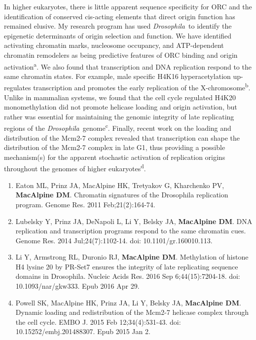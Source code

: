 \documentclass{nihbiosketch}
\newcommand\dros{{\itshape Drosophila}\xspace}
\begin{document}
\begin{enumerate}
In higher eukaryotes, there is little apparent sequence specificity for ORC and the identification of conserved cis-acting elements that direct origin function has remained elusive.  My research program has used \dros\ to identify the epigenetic determinants of origin selection and function. We have identified activating chromatin marks, nucleosome occupancy, and ATP-dependent chromatin remodelers as being predictive features of ORC binding and origin activation\textsuperscript{a}. We also found that transcription and DNA replication respond to the same chromatin states.  For example, male specific H4K16 hyperacetylation up-regulates transcription and promotes the early replication of the X-chromosome\textsuperscript{b}.  Unlike in mammalian systems, we found that the cell cycle regulated H4K20 monomethylation did not promote helicase loading and origin activation, but rather was essential for maintaining the genomic integrity of late replicating regions of the \dros\ genome\textsuperscript{c}.  Finally, recent work on the loading and distribution of the Mcm2-7 complex revealed that transcription can shape the distribution of the Mcm2-7 complex in late G1, thus providing a possible mechanism(s) for the apparent stochastic activation of replication origins throughout the genomes of higher eukaryotes\textsuperscript{d}.



\begin{enumerate}
\setlength\itemsep{0.35em}

\item Eaton ML, Prinz JA, MacAlpine HK, Tretyakov G, Kharchenko PV, \textbf{MacAlpine DM}. Chromatin signatures of the Drosophila replication program. Genome Res. 2011 Feb;21(2):164-74. 

\item Lubelsky Y, Prinz JA, DeNapoli L, Li Y, Belsky JA, \textbf{MacAlpine DM}. DNA
replication and transcription programs respond to the same chromatin cues. Genome Res. 2014 Jul;24(7):1102-14. doi: 10.1101/gr.160010.113. 

\item Li Y, Armstrong RL, Duronio RJ, \textbf{MacAlpine DM}. Methylation of histone H4 lysine 20 by PR-Set7 ensures the integrity of late replicating sequence domains in Drosophila. Nucleic Acids Res. 2016 Sep 6;44(15):7204-18. doi: 10.1093/nar/gkw333. Epub 2016 Apr 29. 

\item Powell SK, MacAlpine HK, Prinz JA, Li Y, Belsky JA, \textbf{MacAlpine DM}. Dynamic
loading and redistribution of the Mcm2-7 helicase complex through the cell cycle. EMBO J. 2015 Feb 12;34(4):531-43. doi: 10.15252/embj.201488307. Epub 2015 Jan 2. 



\end{enumerate}
\end{enumerate}
\end{document}
